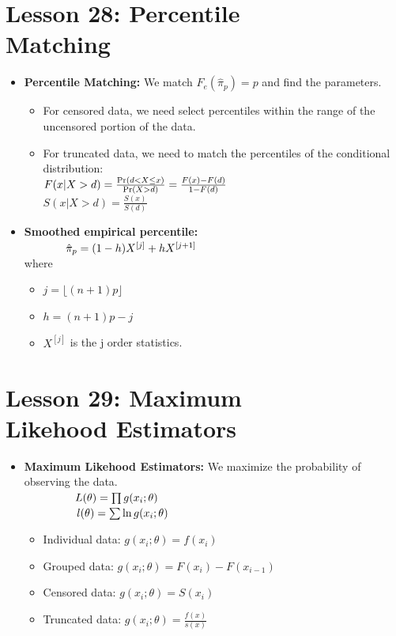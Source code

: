 \documentclass[10pt, french]{article}
\begin{document}
\begin{multicols*}{3}
\section*{Lesson 28: Percentile \\Matching}
\begin{itemize}[align=left,leftmargin=*]
\item \textbf{Percentile Matching:} We match $F_e(\hat{\pi}_{p}) = p$ and find the parameters.
\begin{itemize}
    \item For censored data, we need select percentiles within the range of the uncensored portion of the data.
    \item For truncated data, we need to match the percentiles of the conditional distribution:\\
        $F(x|X>d)=\frac{\Pr \left( d<X\leq x \right)}{\Pr \left( X>d \right)}=\frac{F(x)-F(d)}{1- F(d)}$ \\
        $S(x|X>d)=\frac{S(x)}{S(d)}$
\end{itemize}
\item \textbf{Smoothed empirical percentile:} \\ $\hspace*{1.3cm} \hat{\pi}_{p} = (1-h)X^{[j]} + h X^{[j+1]}$ \\ where
\begin{itemize}
    \item $j = \lfloor (n+1)p \rfloor$
    \item $h = (n+1)p - j$
    \item $X^{[j]}$ is the j order statistics.
\end{itemize}
\end{itemize}

\section*{Lesson 29: Maximum \\Likehood Estimators}
\begin{itemize}[align=left,leftmargin=*]
\item \textbf{Maximum Likehood Estimators:} We maximize the probability of observing the data. \\
$\hspace*{1.6cm} L(\theta) = \prod g(x_i;\theta)$ \\
$\hspace*{1.65cm} l(\theta) = \sum \ln g(x_i;\theta)$
\begin{itemize}
    \item Individual data: $g(x_i;\theta) = f(x_i)$
    \item Grouped data: $g(x_i;\theta) = F(x_i) - F(x_{i-1})$
    \item Censored data: $g(x_i;\theta) = S(x_i) $
    \item Truncated data:  $g(x_i;\theta) = \frac{f(x)}{s(x)} $
\end{itemize}
\end{itemize}



\end{multicols*}
\end{document}

